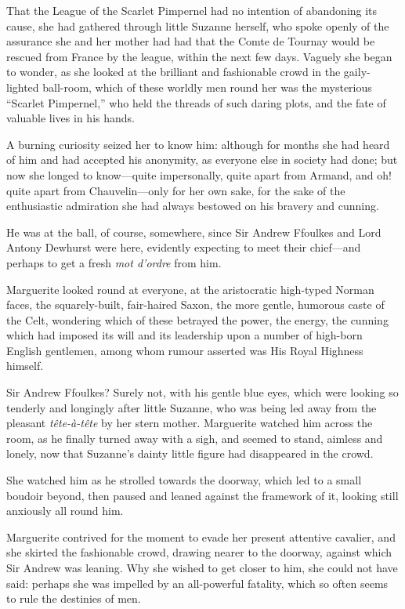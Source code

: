 \documentclass[paper=a5,BCOR=7mm,twoside,DIV=calc,12pt,usegeometry,chapterprefix,endperiod,headings=big]{scrbook}
\begin{document}
That the League of the Scarlet Pimpernel had no intention of abandoning its cause, she had gathered through little Suzanne herself, who spoke openly of the assurance she and her mother had had that the Comte de Tournay would be rescued from France by the league, within the next few days. Vaguely she began to wonder, as she looked at the brilliant and fashionable crowd in the gaily-lighted ball-room, which of these worldly men round her was the mysterious \enquote{Scarlet Pimpernel,} who held the threads of such daring plots, and the fate of valuable lives in his hands.

A burning curiosity seized her to know him: although for months she had heard of him and had accepted his anonymity, as everyone else in society had done; but now she longed to know---quite impersonally, quite apart from Armand, and oh! quite apart from Chauvelin---only for her own sake, for the sake of the enthusiastic admiration she had always bestowed on his bravery and cunning.

He was at the ball, of course, somewhere, since Sir Andrew Ffoulkes and Lord Antony Dewhurst were here, evidently expecting to meet their chief---and perhaps to get a fresh \textit{mot d'ordre} from him.

Marguerite looked round at everyone, at the aristocratic high-typed Norman faces, the squarely-built, fair-haired Saxon, the more gentle, humorous caste of the Celt, wondering which of these betrayed the power, the energy, the cunning which had imposed its will and its leadership upon a number of high-born English gentlemen, among whom rumour asserted was His Royal Highness himself.

Sir Andrew Ffoulkes? Surely not, with his gentle blue eyes, which were looking so tenderly and longingly after little Suzanne, who was being led away from the pleasant \textit{tête-à-tête} by her stern mother. Marguerite watched him across the room, as he finally turned away with a sigh, and seemed to stand, aimless and lonely, now that Suzanne's dainty little figure had disappeared in the crowd.

She watched him as he strolled towards the doorway, which led to a small boudoir beyond, then paused and leaned against the framework of it, looking still anxiously all round him.

Marguerite contrived for the moment to evade her present attentive cavalier, and she skirted the fashionable crowd, drawing nearer to the doorway, against which Sir Andrew was leaning. Why she wished to get closer to him, she could not have said: perhaps she was impelled by an all-powerful fatality, which so often seems to rule the destinies of men.
\end{document}
